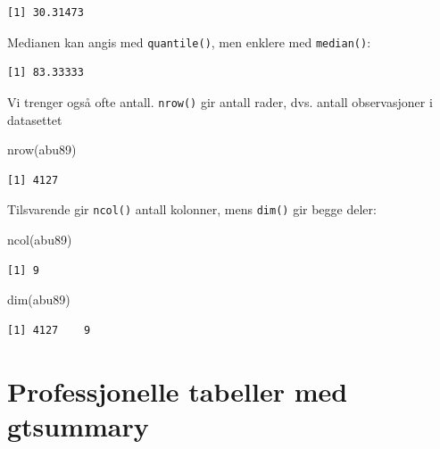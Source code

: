 \documentclass[
  letterpaper,
  DIV=11,
  numbers=noendperiod]{scrreprt}
\newenvironment{Shaded}{\begin{snugshade}}{\end{snugshade}}
\newcommand{\AttributeTok}[1]{\textcolor[rgb]{0.40,0.45,0.13}{#1}}
\newcommand{\ConstantTok}[1]{\textcolor[rgb]{0.56,0.35,0.01}{#1}}
\newcommand{\FunctionTok}[1]{\textcolor[rgb]{0.28,0.35,0.67}{#1}}
\newcommand{\NormalTok}[1]{\textcolor[rgb]{0.00,0.23,0.31}{#1}}
\newcommand{\SpecialCharTok}[1]{\textcolor[rgb]{0.37,0.37,0.37}{#1}}
\theoremstyle{definition}
\theoremstyle{remark}
\begin{document}
\begin{verbatim}
[1] 30.31473
\end{verbatim}

Medianen kan angis med \texttt{quantile()}, men enklere med
\texttt{median()}:

\begin{Shaded}
\end{Shaded}

\begin{verbatim}
[1] 83.33333
\end{verbatim}

Vi trenger også ofte antall. \texttt{nrow()} gir antall rader, dvs.
antall observasjoner i datasettet

\begin{Shaded}
\begin{Highlighting}[]
\FunctionTok{nrow}\NormalTok{(abu89)}
\end{Highlighting}
\end{Shaded}

\begin{verbatim}
[1] 4127
\end{verbatim}

Tilsvarende gir \texttt{ncol()} antall kolonner, mens \texttt{dim()} gir
begge deler:

\begin{Shaded}
\begin{Highlighting}[]
\FunctionTok{ncol}\NormalTok{(abu89)}
\end{Highlighting}
\end{Shaded}

\begin{verbatim}
[1] 9
\end{verbatim}

\begin{Shaded}
\begin{Highlighting}[]
\FunctionTok{dim}\NormalTok{(abu89)}
\end{Highlighting}
\end{Shaded}

\begin{verbatim}
[1] 4127    9
\end{verbatim}

\hypertarget{professjonelle-tabeller-med-gtsummary}{%
\section{Professjonelle tabeller med
gtsummary}\label{professjonelle-tabeller-med-gtsummary}}
\end{document}
